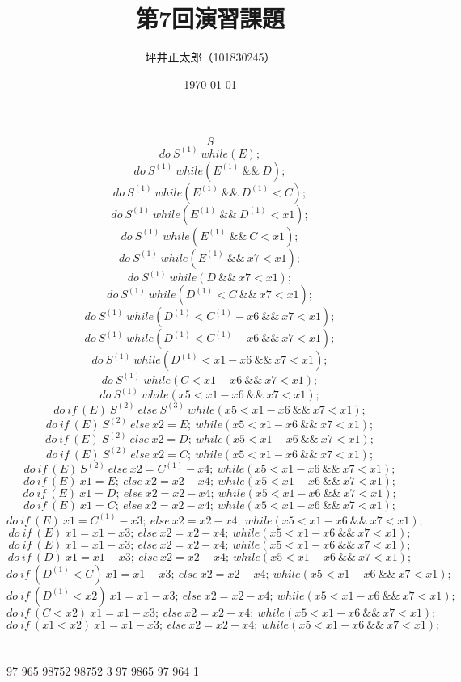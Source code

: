 \documentclass[a4paper,10pt]{jsarticle}
\begin{document}
\title{第7回演習課題}
\author{坪井正太郎（101830245）}
\date{\today}
\maketitle
\section{}
\[S\]
\[do\ S^{(1)}\ while(E);\]
\[do\ S^{(1)}\ while(E^{(1)}\ \&\&\ D);\]
\[do\ S^{(1)}\ while(E^{(1)}\ \&\&\ D^{(1)}<C);\]
\[do\ S^{(1)}\ while(E^{(1)}\ \&\&\ D^{(1)}<x1);\]
\[do\ S^{(1)}\ while(E^{(1)}\ \&\&\ C<x1);\]
\[do\ S^{(1)}\ while(E^{(1)}\ \&\&\ x7<x1);\]
\[do\ S^{(1)}\ while(D\ \&\&\ x7<x1);\]
\[do\ S^{(1)}\ while(D^{(1)}<C\ \&\&\ x7<x1);\]
\[do\ S^{(1)}\ while(D^{(1)}<C^{(1)}-x6\ \&\&\ x7<x1);\]
\[do\ S^{(1)}\ while(D^{(1)}<C^{(1)}-x6\ \&\&\ x7<x1);\]
\[do\ S^{(1)}\ while(D^{(1)}<x1-x6\ \&\&\ x7<x1);\]
\[do\ S^{(1)}\ while(C<x1-x6\ \&\&\ x7<x1);\]
\[do\ S^{(1)}\ while(x5<x1-x6\ \&\&\ x7<x1);\]
\[do\ if\ (E)\ S^{(2)}\ else\ S^{(3)}\ while(x5<x1-x6\ \&\&\ x7<x1);\]
\[do\ if\ (E)\ S^{(2)}\ else\ x2=E;\ while(x5<x1-x6\ \&\&\ x7<x1);\]
\[do\ if\ (E)\ S^{(2)}\ else\ x2=D;\ while(x5<x1-x6\ \&\&\ x7<x1);\]
\[do\ if\ (E)\ S^{(2)}\ else\ x2=C;\ while(x5<x1-x6\ \&\&\ x7<x1);\]
\[do\ if\ (E)\ S^{(2)}\ else\ x2=C^{(1)}-x4;\ while(x5<x1-x6\ \&\&\ x7<x1);\]
\[do\ if\ (E)\ x1=E;\ else\ x2=x2-x4;\ while(x5<x1-x6\ \&\&\ x7<x1);\]
\[do\ if\ (E)\ x1=D;\ else\ x2=x2-x4;\ while(x5<x1-x6\ \&\&\ x7<x1);\]
\[do\ if\ (E)\ x1=C;\ else\ x2=x2-x4;\ while(x5<x1-x6\ \&\&\ x7<x1);\]
\[do\ if\ (E)\ x1=C^{(1)}-x3;\ else\ x2=x2-x4;\ while(x5<x1-x6\ \&\&\ x7<x1);\]
\[do\ if\ (E)\ x1=x1-x3;\ else\ x2=x2-x4;\ while(x5<x1-x6\ \&\&\ x7<x1);\]
\[do\ if\ (E)\ x1=x1-x3;\ else\ x2=x2-x4;\ while(x5<x1-x6\ \&\&\ x7<x1);\]
\[do\ if\ (D)\ x1=x1-x3;\ else\ x2=x2-x4;\ while(x5<x1-x6\ \&\&\ x7<x1);\]
\[do\ if\ (D^{(1)}<C)\ x1=x1-x3;\ else\ x2=x2-x4;\ while(x5<x1-x6\ \&\&\ x7<x1);\]
\[do\ if\ (D^{(1)}<x2)\ x1=x1-x3;\ else\ x2=x2-x4;\ while(x5<x1-x6\ \&\&\ x7<x1);\]
\[do\ if\ (C<x2)\ x1=x1-x3;\ else\ x2=x2-x4;\ while(x5<x1-x6\ \&\&\ x7<x1);\]
\[do\ if\ (x1<x2)\ x1=x1-x3;\ else\ x2=x2-x4;\ while(x5<x1-x6\ \&\&\ x7<x1);\]

\section{}
97 965 98752 98752 3 97 9865 97 964 1

\newpage
\section{}
\end{document}
